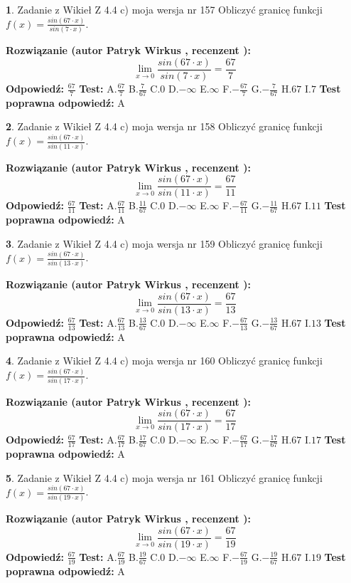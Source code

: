 \documentclass[12pt, a4paper]{article}
\theoremstyle{definition} %
\newtheorem{zad}{}
\newcommand{\zadStart}[1]{\begin{zad}#1\newline}
\newcommand{\zadStop}{\end{zad}}
\newcommand{\rozwStart}[2]{\noindent \textbf{Rozwiązanie (autor #1 , recenzent #2): }\newline}
\newcommand{\rozwStop}{\newline}
\newcommand{\odpStart}{\noindent \textbf{Odpowiedź:}\newline}
\newcommand{\odpStop}{\newline}
\newcommand{\testStart}{\noindent \textbf{Test:}\newline}
\newcommand{\testStop}{\newline}
\newcommand{\kluczStart}{\noindent \textbf{Test poprawna odpowiedź:}\newline}
\newcommand{\kluczStop}{\newline}
\begin{document}
\zadStart{Zadanie z Wikieł Z 4.4 c) moja wersja nr 157}
Obliczyć granicę funkcji $f(x)=\frac{sin(67\cdot x)}{sin(7\cdot x)}$.
\zadStop
\rozwStart{Patryk Wirkus}{}
$$\lim\limits_{x\to 0}\frac{sin(67\cdot x)}{sin(7\cdot x)}=
\frac{67}{7}$$
\rozwStop
\odpStart
$\frac{67}{7}$
\odpStop
\testStart
A.$\frac{67}{7}$
B.$\frac{7}{67}$
C.$0$
D.$-\infty$
E.$\infty$
F.$-\frac{67}{7}$
G.$-\frac{7}{67}$
H.$67$
I.$7$
\testStop
\kluczStart
A
\kluczStop



\zadStart{Zadanie z Wikieł Z 4.4 c) moja wersja nr 158}
Obliczyć granicę funkcji $f(x)=\frac{sin(67\cdot x)}{sin(11\cdot x)}$.
\zadStop
\rozwStart{Patryk Wirkus}{}
$$\lim\limits_{x\to 0}\frac{sin(67\cdot x)}{sin(11\cdot x)}=
\frac{67}{11}$$
\rozwStop
\odpStart
$\frac{67}{11}$
\odpStop
\testStart
A.$\frac{67}{11}$
B.$\frac{11}{67}$
C.$0$
D.$-\infty$
E.$\infty$
F.$-\frac{67}{11}$
G.$-\frac{11}{67}$
H.$67$
I.$11$
\testStop
\kluczStart
A
\kluczStop



\zadStart{Zadanie z Wikieł Z 4.4 c) moja wersja nr 159}
Obliczyć granicę funkcji $f(x)=\frac{sin(67\cdot x)}{sin(13\cdot x)}$.
\zadStop
\rozwStart{Patryk Wirkus}{}
$$\lim\limits_{x\to 0}\frac{sin(67\cdot x)}{sin(13\cdot x)}=
\frac{67}{13}$$
\rozwStop
\odpStart
$\frac{67}{13}$
\odpStop
\testStart
A.$\frac{67}{13}$
B.$\frac{13}{67}$
C.$0$
D.$-\infty$
E.$\infty$
F.$-\frac{67}{13}$
G.$-\frac{13}{67}$
H.$67$
I.$13$
\testStop
\kluczStart
A
\kluczStop



\zadStart{Zadanie z Wikieł Z 4.4 c) moja wersja nr 160}
Obliczyć granicę funkcji $f(x)=\frac{sin(67\cdot x)}{sin(17\cdot x)}$.
\zadStop
\rozwStart{Patryk Wirkus}{}
$$\lim\limits_{x\to 0}\frac{sin(67\cdot x)}{sin(17\cdot x)}=
\frac{67}{17}$$
\rozwStop
\odpStart
$\frac{67}{17}$
\odpStop
\testStart
A.$\frac{67}{17}$
B.$\frac{17}{67}$
C.$0$
D.$-\infty$
E.$\infty$
F.$-\frac{67}{17}$
G.$-\frac{17}{67}$
H.$67$
I.$17$
\testStop
\kluczStart
A
\kluczStop



\zadStart{Zadanie z Wikieł Z 4.4 c) moja wersja nr 161}
Obliczyć granicę funkcji $f(x)=\frac{sin(67\cdot x)}{sin(19\cdot x)}$.
\zadStop
\rozwStart{Patryk Wirkus}{}
$$\lim\limits_{x\to 0}\frac{sin(67\cdot x)}{sin(19\cdot x)}=
\frac{67}{19}$$
\rozwStop
\odpStart
$\frac{67}{19}$
\odpStop
\testStart
A.$\frac{67}{19}$
B.$\frac{19}{67}$
C.$0$
D.$-\infty$
E.$\infty$
F.$-\frac{67}{19}$
G.$-\frac{19}{67}$
H.$67$
I.$19$
\testStop
\kluczStart
A
\kluczStop
\end{document}
